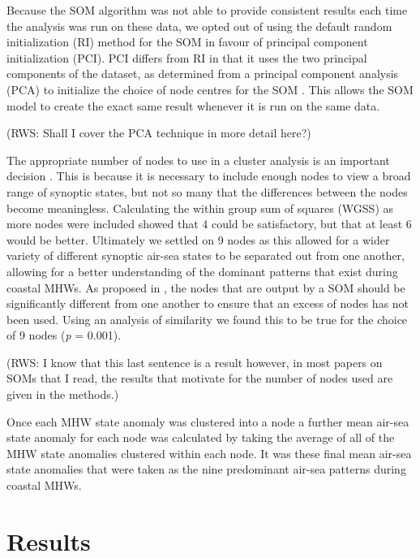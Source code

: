 \documentclass[a4paper,10pt,review]{elsarticle}
\begin{document}
Because the SOM algorithm was not able to provide consistent results each time the analysis was run on these data, we opted out of using the default random initialization (RI) method for the SOM in favour of principal component initialization (PCI). PCI differs from RI in that it uses the two principal components of the dataset, as determined from a principal component analysis (PCA) to initialize the choice of node centres for the SOM \citep{Akinduko2016}. This allows the SOM model to create the exact same result whenever it is run on the same data.

(RWS: Shall I cover the PCA technique in more detail here?)

The appropriate number of nodes to use in a cluster analysis is an important decision \citep{Gibson2016a}. This is because it is necessary to include enough nodes to view a broad range of synoptic states, but not so many that the differences between the nodes become meaningless. Calculating the within group sum of squares (WGSS) as more nodes were included showed that 4 could be satisfactory, but that at least 6 would be better. Ultimately we settled on 9 nodes as this allowed for a wider variety of different synoptic air-sea states to be separated out from one another, allowing for a better understanding of the dominant patterns that exist during coastal MHWs. As proposed in \citet{Johnson2013}, the nodes that are output by a SOM should be significantly different from one another to ensure that an excess of nodes has not been used. Using an analysis of similarity we found this to be true for the choice of 9 nodes (\emph{p} = 0.001).

(RWS: I know that this last sentence is a result however, in most papers on SOMs that I read, the results that motivate for the number of nodes used are given in the methods.)

Once each MHW state anomaly was clustered into a node a further mean air-sea state anomaly for each node was calculated by taking the average of all of the MHW state anomalies clustered within each node. It was these final mean air-sea state anomalies that were taken as the nine predominant air-sea patterns during coastal MHWs.

\section{Results}
\end{document}
